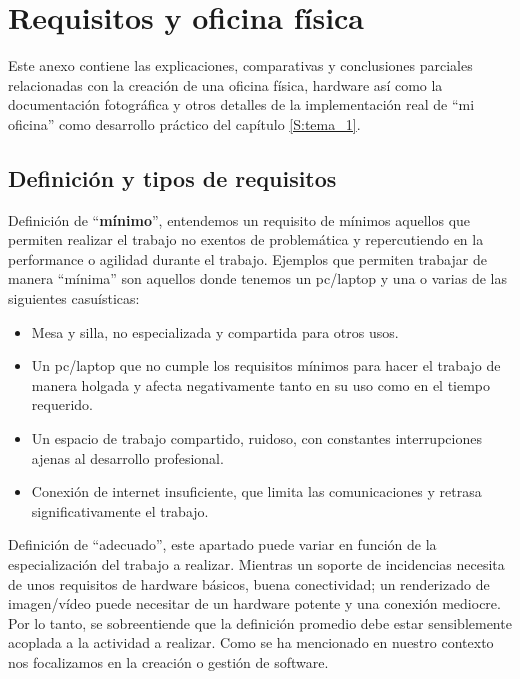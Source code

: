 \chapter{Requisitos y oficina física}\label{S:anexo_B}
Este anexo contiene las explicaciones, comparativas y conclusiones parciales relacionadas con la creación de una oficina física, hardware así como la documentación fotográfica y otros detalles de la implementación real de “mi oficina” como desarrollo práctico del capítulo \ref{S:tema_1}.

\section{Definición y tipos de requisitos}\label{S:requisitos}

Definición de “\textbf{mínimo}”, entendemos un requisito de mínimos aquellos que permiten realizar el trabajo no exentos de problemática y repercutiendo en la performance o agilidad durante el trabajo. Ejemplos que permiten trabajar de manera “mínima” son aquellos donde tenemos un pc/laptop  y una o varias de las siguientes casuísticas:
\begin{itemize}
    \item Mesa y silla, no especializada y compartida para otros usos.
    
    \item Un pc/laptop que no cumple los requisitos mínimos para hacer el trabajo de manera holgada y afecta negativamente tanto en su uso como en el tiempo requerido.
    
    \item Un espacio de trabajo compartido, ruidoso, con constantes interrupciones ajenas al desarrollo profesional.
    
    \item Conexión de internet insuficiente, que limita las comunicaciones y retrasa significativamente el trabajo.
    
\end{itemize}

Definición de “adecuado”, este apartado puede variar en función de la especialización del trabajo a realizar. Mientras un soporte de incidencias necesita de unos requisitos de hardware básicos, buena conectividad; un renderizado de imagen/vídeo puede necesitar de un hardware potente y una conexión mediocre. Por lo tanto, se sobreentiende que la definición promedio debe estar sensiblemente acoplada a la actividad a realizar. Como se ha mencionado en nuestro contexto nos focalizamos en la creación o gestión de software.

